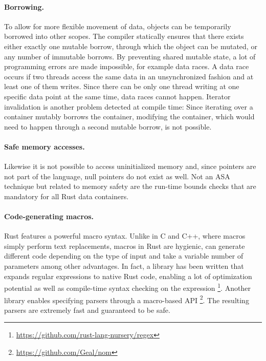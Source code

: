 \documentclass{scrartcl}
\begin{document}
\paragraph{Borrowing.} To allow for more flexible movement of data, objects can be temporarily borrowed into other scopes. The compiler statically ensures that there exists either exactly one mutable borrow, through which the object can be mutated, or any number of immutable borrows. By preventing shared mutable state, a lot of programming errors are made impossible, for example data races. A data race occurs if two threads access the same data in an unsynchronized fashion and at least one of them writes. Since there can be only one thread writing at one specific data point at the same time, data races cannot happen. Iterator invalidation is another problem detected at compile time: Since iterating over a container mutably borrows the container, modifying the container, which would need to happen through a second mutable borrow, is not possible.

\paragraph{Safe memory accesses.} Likewise it is not possible to access uninitialized memory and, since pointers are not part of the language, null pointers do not exist as well. Not an ASA technique but related to memory safety are the run-time bounds checks that are mandatory for all Rust data containers.

\paragraph{Code-generating macros.} Rust features a powerful macro syntax. Unlike in C and C++, where macros simply perform text replacements, macros in Rust are hygienic, can generate different code depending on the type of input and take a variable number of parameters among other advantages. In fact, a library has been written that expands regular expressions to native Rust code, enabling a lot of optimization potential as well as compile-time syntax checking on the expression \footnote{\url{https://github.com/rust-lang-nursery/regex}}. Another library enables specifying parsers through a macro-based API \footnote{\url{https://github.com/Geal/nom}}. The resulting parsers are extremely fast and guaranteed to be safe.
\end{document}
